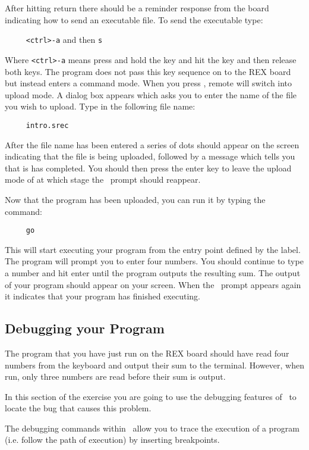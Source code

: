 After hitting return there should be a reminder response from the board indicating 
how to send an executable file. To send the executable type:

\verb|     <ctrl>-a| and then \verb|s|

Where \verb|<ctrl>-a| means press and hold the  key and hit 
the  key and then release both keys.
The  program does not pass this key sequence on to the REX 
board but instead enters a command
mode. When you press , remote will switch into upload mode. A
dialog box appears which asks you to enter the name of the file you wish to 
upload. Type in the following file name:
\begin{verbatim}
     intro.srec
\end{verbatim}

After the file name has been entered a series of dots should appear on the 
screen indicating that the file is being
uploaded, followed by a message which tells you that is has completed. You 
should then press the enter key to
leave the upload mode of  at which stage the \WRAMPmon\ prompt 
should reappear.

Now that the program has been uploaded, you can run it by typing the command:
\begin{verbatim}
     go
\end{verbatim}

This will start executing your program from the entry point defined by the 
 label. The program will
prompt you to enter four numbers. You should continue to type a number and 
hit enter until the program
outputs the resulting sum. The output of your program should appear on your 
screen. When the \WRAMPmon\
prompt appears again it indicates that your program has finished executing.


\subsection{Debugging your Program}
The program that you have just run on the REX board should have read four 
numbers from the keyboard and
output their sum to the terminal. However, when run, only three numbers
are read before their sum is output.

In this section of the exercise you are going to use the debugging 
features of \WRAMPmon\ to locate the bug that
causes this problem.

The debugging commands within \WRAMPmon\ allow you to trace the execution 
of a program (i.e. follow the path
of execution) by inserting breakpoints.

